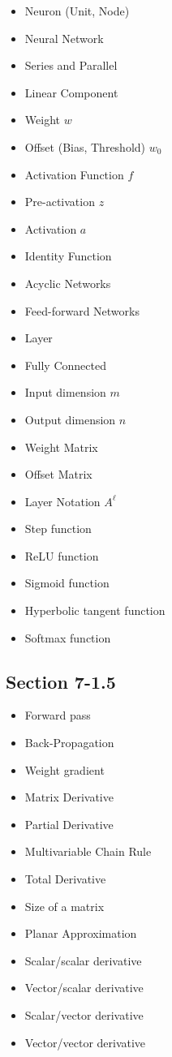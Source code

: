     \begin{itemize}
        \item Neuron (Unit, Node)
        \item Neural Network
        \item Series and Parallel
        \item Linear Component
        \item Weight $w$
        \item Offset (Bias, Threshold) $w_0$
        \item Activation Function $f$
        \item Pre-activation $z$
        \item Activation $a$
        \item Identity Function
        \item Acyclic Networks
        \item Feed-forward Networks
        \item Layer
        \item Fully Connected
        \item Input dimension $m$
        \item Output dimension $n$
        \item Weight Matrix
        \item Offset Matrix
        \item Layer Notation $A^\ell$
        \item Step function
        \item ReLU function
        \item Sigmoid function
        \item Hyperbolic tangent function
        \item Softmax function
    \end{itemize}

    \subsection*{Section 7-1.5}

    
    \begin{itemize}
        \item Forward pass
        \item Back-Propagation
        \item Weight gradient
        \item Matrix Derivative
        \item Partial Derivative
        \item Multivariable Chain Rule
        \item Total Derivative
        \item Size of a matrix
        \item Planar Approximation
        \item Scalar/scalar derivative
        \item Vector/scalar derivative
        \item Scalar/vector derivative
        \item Vector/vector derivative
        
    \end{itemize}

